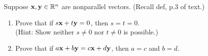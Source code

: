\begin{problem}[SA 1.1.25]
Suppose $\mathbf{x}, \mathbf{y} \in \mathbb{R}^n$ are nonparallel vectors. (Recall def, p.3 of text.)
\begin{enumerate}
\item 
Prove that if $s\mathbf{x} + t\mathbf{y} = 0$, then $s = t = 0$. \\
(Hint: Show neither $s \neq 0$ nor $t \neq0$ is possible.)
\item Prove that if $a\mathbf{x} + b\mathbf{y} = c\mathbf{x} + d\mathbf{y}$, then $a = c$ and $b = d$.
\end{enumerate}
\end{problem}



